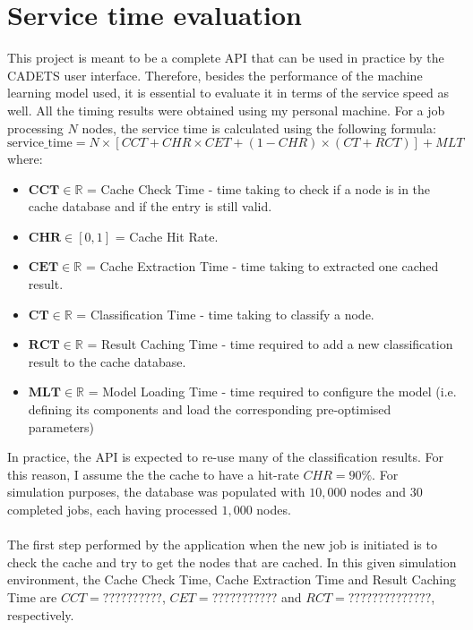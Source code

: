 		\section{Service time evaluation} \label{Section: eval/service-time}
			This project is meant to be a complete API that can be used in practice by the CADETS user interface. Therefore, besides the performance of the machine learning model used, it is essential to evaluate it in terms of the service speed as well. All the timing results were obtained using my personal machine. For a job processing $N$ nodes, the service time is calculated using the following formula:  
			\begin{equation}
				\text{service\_time} = N\times [CCT + CHR \times CET + (1-CHR) \times (CT + RCT)] + MLT
				\label{Eq: eval/service-time/overall}
			\end{equation}
			where: 
			\begin{itemize}
				\item $\mathbf{CCT} \in \mathbb{R}$ = Cache Check Time - time taking to check if a node is in the cache database and if the entry is still valid.
				\item $\mathbf{CHR} \in [0, 1]$ = Cache Hit Rate.
				\item $\textbf{CET} \in \mathbb{R}$ = Cache Extraction Time - time taking to extracted one cached result.
				\item $\textbf{CT} \in \mathbb{R}$ = Classification Time - time taking to classify a node. 
				\item $\textbf{RCT} \in \mathbb{R}$ = Result Caching Time - time required to add a new classification result to the cache database.
				\item $\mathbf{MLT} \in \mathbb{R}$ = Model Loading Time - time required to configure the model (i.e. defining its components and load the corresponding pre-optimised parameters)
			\end{itemize}
			In practice, the API is expected to re-use many of the classification results. For this reason, I assume the the cache to have a hit-rate $CHR = 90\%$. For simulation purposes, the database was populated with $10, 000$ nodes and $30$ completed jobs, each having processed $1, 000$ nodes. 
			\\ \\
			The first step performed by the application when the new job is initiated is to check the cache and try to get the nodes that are cached. In this given simulation environment, the Cache Check Time, Cache Extraction Time and Result Caching Time are $CCT=??????????$, $CET=???????????$ and $RCT=??????????????$, respectively.  
			
